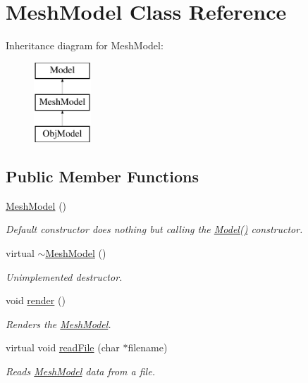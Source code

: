 \hypertarget{classMeshModel}{\section{Mesh\-Model Class Reference}
\label{classMeshModel}
}
Inheritance diagram for Mesh\-Model\-:\begin{figure}[H]
\begin{center}
\leavevmode
\includegraphics[height=3.000000cm]{classMeshModel}
\end{center}
\end{figure}
\subsection*{Public Member Functions}
\begin{DoxyCompactItemize}
\item 
\hypertarget{classMeshModel_a70765fc2bcc28904bdc0fd38eb8cd745}{\hyperlink{classMeshModel_a70765fc2bcc28904bdc0fd38eb8cd745}{Mesh\-Model} ()}\label{classMeshModel_a70765fc2bcc28904bdc0fd38eb8cd745}

\begin{DoxyCompactList}\small\item\em Default constructor does nothing but calling the \hyperlink{classModel_ae3b375de5f6df4faf74a95d64748e048}{Model()} constructor. \end{DoxyCompactList}\item 
\hypertarget{classMeshModel_acad5fe11036271fce2f7258f9cf3fbe4}{virtual \hyperlink{classMeshModel_acad5fe11036271fce2f7258f9cf3fbe4}{$\sim$\-Mesh\-Model} ()}\label{classMeshModel_acad5fe11036271fce2f7258f9cf3fbe4}

\begin{DoxyCompactList}\small\item\em Unimplemented destructor. \end{DoxyCompactList}\item 
\hypertarget{classMeshModel_a794db0d087fc1810cb3510ef0050ad28}{void \hyperlink{classMeshModel_a794db0d087fc1810cb3510ef0050ad28}{render} ()}\label{classMeshModel_a794db0d087fc1810cb3510ef0050ad28}

\begin{DoxyCompactList}\small\item\em Renders the \hyperlink{classMeshModel}{Mesh\-Model}. \end{DoxyCompactList}\item 
virtual void \hyperlink{classMeshModel_a79b1081f6b6ff72bf8fc24dc89578977}{read\-File} (char $\ast$filename)
\begin{DoxyCompactList}\small\item\em Reads \hyperlink{classMeshModel}{Mesh\-Model} data from a file. \end{DoxyCompactList}\end{DoxyCompactItemize}


